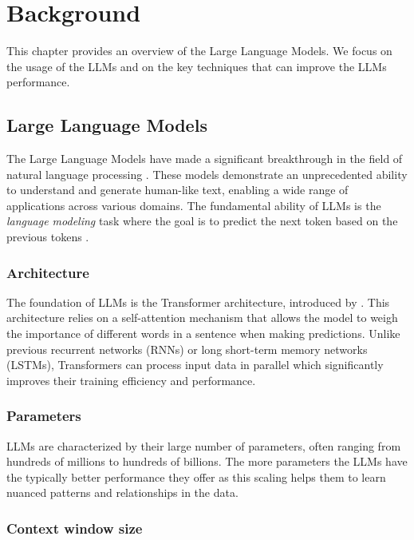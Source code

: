 \chapter{Background}

This chapter provides an overview of the Large Language Models. We focus on the usage of the LLMs and on the key techniques that can improve the LLMs performance.


\section{Large Language Models}

The Large Language Models have made a significant breakthrough in the field of natural language processing \cite{Peters2018,Devlin2019,Brown2020}.
These models demonstrate an unprecedented ability to understand and generate human-like text, enabling a wide range of applications across various domains. The fundamental ability of LLMs is the \emph{language modeling} task where the goal is to predict the next token based on the previous tokens \cite{Bengio2000}.


\subsection{Architecture}

The foundation of LLMs is the Transformer architecture, introduced by \citet{Vaswani2017}. This architecture relies on a self-attention mechanism that allows the model to weigh the importance of different words in a sentence when making predictions. Unlike previous recurrent networks (RNNs) or long short-term memory networks (LSTMs), Transformers can process input data in parallel which significantly improves their training efficiency and performance.


\subsection{Parameters}

LLMs are characterized by their large number of parameters, often ranging from hundreds of millions to hundreds of billions. The more parameters the LLMs have the typically better performance they offer \cite{Kaplan2020} as this scaling helps them to learn nuanced patterns and relationships in the data.


\subsection{Context window size}

